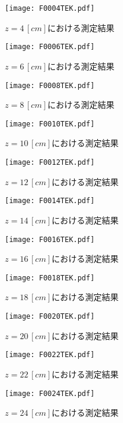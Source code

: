 \begin{figure}[H]
    \centering
    \texttt{[image: F0004TEK.pdf]}
    \caption{$z=4\,[cm]$における測定結果}
\end{figure}

\begin{figure}[H]
    \centering
    \texttt{[image: F0006TEK.pdf]}
    \caption{$z=6\,[cm]$における測定結果}
\end{figure}

\begin{figure}[H]
    \centering
    \texttt{[image: F0008TEK.pdf]}
    \caption{$z=8\,[cm]$における測定結果}
\end{figure}

\begin{figure}[H]
    \centering
    \texttt{[image: F0010TEK.pdf]}
    \caption{$z=10\,[cm]$における測定結果}
\end{figure}

\begin{figure}[H]
    \centering
    \texttt{[image: F0012TEK.pdf]}
    \caption{$z=12\,[cm]$における測定結果}
\end{figure}

\begin{figure}[H]
    \centering
    \texttt{[image: F0014TEK.pdf]}
    \caption{$z=14\,[cm]$における測定結果}
\end{figure}

\begin{figure}[H]
    \centering
    \texttt{[image: F0016TEK.pdf]}
    \caption{$z=16\,[cm]$における測定結果}
\end{figure}

\begin{figure}[H]
    \centering
    \texttt{[image: F0018TEK.pdf]}
    \caption{$z=18\,[cm]$における測定結果}
\end{figure}

\begin{figure}[H]
    \centering
    \texttt{[image: F0020TEK.pdf]}
    \caption{$z=20\,[cm]$における測定結果}
\end{figure}

\begin{figure}[H]
    \centering
    \texttt{[image: F0022TEK.pdf]}
    \caption{$z=22\,[cm]$における測定結果}
\end{figure}

\begin{figure}[H]
    \centering
    \texttt{[image: F0024TEK.pdf]}
    \caption{$z=24\,[cm]$における測定結果}
\end{figure}

